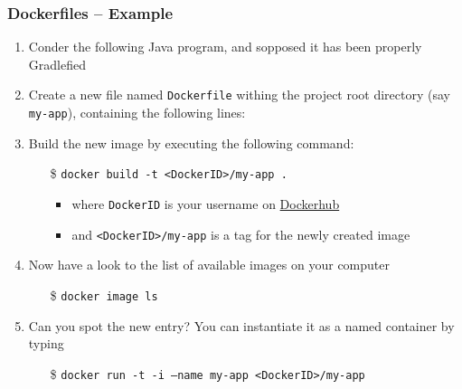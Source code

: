 \documentclass[presentation]{beamer}\mode<presentation>{\usetheme{AMSBolognaFC}}
\begin{document}
\begin{frame}[allowframebreaks]
\frametitle{Dockerfiles -- Example}

    \begin{enumerate}
        \item Conder the following Java program, and sopposed it has been properly Gradlefied
        

        \framebreak

        \item Create a new file named \alert{\texttt{Dockerfile}} withing the project root directory (say \alert{\texttt{my-app}}), containing the following lines:
        

        \framebreak

        \item Build the new image by executing the following command:
        \begin{itemize}
            \item[\$] \texttt{docker \alert{build} -t <DockerID>/my-app \alert{.}}
            \begin{itemize}
                \item where \texttt{DockerID} is your username on \href{https://hub.docker.com/}{Dockerhub}
                \item and \alert{\texttt{<DockerID>/my-app}} is a \alert{tag} for the newly created image
            \end{itemize}
        \end{itemize}

        \item Now have a look to the list of available images on your computer
        \begin{itemize}
            \item[\$] \texttt{docker image ls}
        \end{itemize}

        \item Can you spot the new entry? You can instantiate it as a \alert{named} container by typing
        \begin{itemize}
            \item[\$] \texttt{docker run -t -i \alert{--name my-app} <DockerID>/my-app}
        \end{itemize}


\end{enumerate}
\end{frame}
\end{document}
